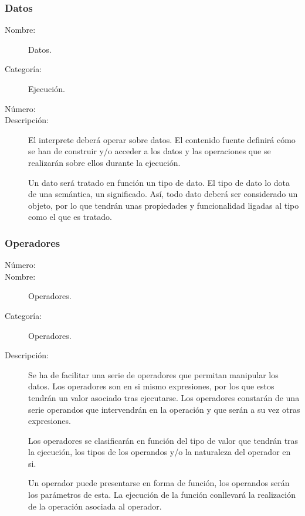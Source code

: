 \subsubsection{Datos}
\begin{framed}
	\begin{description}
		\item [Nombre:] Datos.
		\item [Categoría:] Ejecución.
		\item [Número:] \cn
		\item [Descripción:] El interprete deberá operar sobre datos. El contenido fuente 
      definirá cómo se han de construir y/o acceder a los datos y las operaciones que se realizarán sobre ellos durante la ejecución. 
      
      Un dato será tratado en función un tipo de dato. El tipo de dato lo dota de una semántica, un significado.
      Así, todo dato deberá ser considerado un objeto, por lo que tendrán unas propiedades y funcionalidad ligadas al tipo como el que es tratado.
      
	\end {description}
\end{framed}

\subsubsection{Operadores}
\begin{framed}
	\begin{description}
		\item [Número:] \cn
		\item [Nombre:] Operadores.
		\item [Categoría:] Operadores.
		\item [Descripción:] Se ha de facilitar una serie de operadores que permitan manipular los datos. Los operadores
		son en si mismo expresiones, por los que estos tendrán un valor asociado tras ejecutarse. Los operadores constarán
		de una serie operandos que intervendrán en la operación y que serán a su vez otras expresiones.
		
      Los operadores se clasificarán en función del tipo de valor que tendrán tras la ejecución, los tipos de
		los operandos y/o la naturaleza del operador en si.  
      
      Un operador puede presentarse en forma de función, los operandos serán los parámetros de esta. La ejecución
      de la función conllevará la realización de la operación asociada al operador.
	\end {description}
\end{framed}

